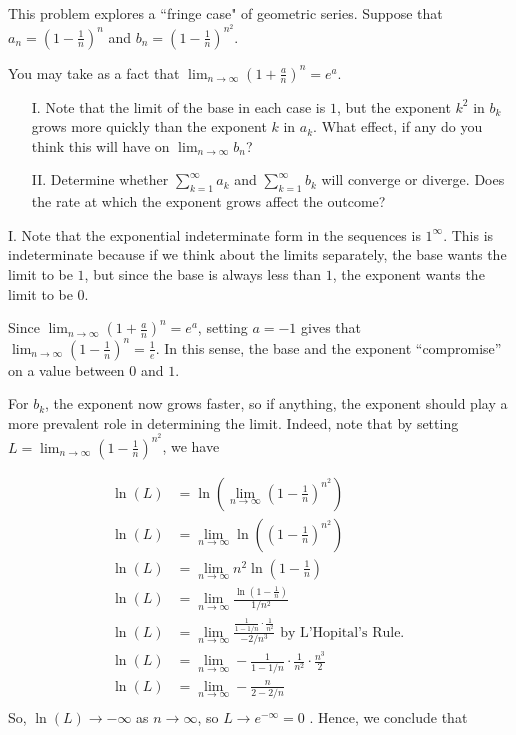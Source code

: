 \documentclass[noauthor,handout]{ximera}
\begin{document}
\begin{problem}
This problem explores a ``fringe case" of geometric series.  Suppose that $a_n = \left(1-\frac{1}{n}\right)^n$ and $b_n = \left(1-\frac{1}{n}\right)^{n^2}$.  

You may take as a fact that $\lim_{n \to \infty} \left(1+\frac{a}{n}\right)^n = e^a$.

\begin{itemize}
\item[I.] Note that the limit of the base in each case is $1$, but the exponent $k^2$ in $b_k$ grows more quickly than the exponent $k$ in $a_k$.  What effect, if any do you think this will have on $\lim_{n \to \infty} b_n$?
\item[II.] Determine whether $\sum_{k=1}^{\infty} a_k$ and $\sum_{k=1}^{\infty} b_k$ will converge or diverge.  Does the rate at which the exponent grows affect the outcome?
\end{itemize}

\begin{freeResponse}
I. Note that the exponential indeterminate form in the sequences is $1^{\infty}$.  This is indeterminate because if we think about the limits separately, the base wants the limit to be $1$, but since the base is always less than $1$, the exponent wants the limit to be $0$. 

Since $\lim_{n \to \infty} \left(1+\frac{a}{n}\right)^n = e^a$, setting $a=-1$ gives that $\lim_{n \to \infty} \left(1-\frac{1}{n}\right)^n = \frac{1}{e}.$  In this sense, the base and the exponent ``compromise'' on a value between $0$ and $1$.  

For $b_k$, the exponent now grows faster, so if anything, the exponent should play a more prevalent role in determining the limit.  Indeed, note that by setting $L = \lim_{n \to \infty} \left(1-\frac{1}{n}\right)^{n^2}$, we have

\begin{align*}
\ln(L) &= \ln\left(  \lim_{n \to \infty} \left(1-\frac{1}{n}\right)^{n^2} \right) \\
\ln(L) &= \lim_{n \to \infty} \ln\left(\left(1-\frac{1}{n}\right)^{n^2} \right) \\
\ln(L) &= \lim_{n \to \infty} n^2 \ln \left(1-\frac{1}{n}\right) \\
\ln(L) &= \lim_{n \to \infty} \frac{\ln \left(1-\frac{1}{n}\right)}{1/n^2} \\
\ln(L) &= \lim_{n \to \infty} \frac{\frac{1}{1-1/n} \cdot \frac{1}{n^2}}{-2/n^3} \textrm{ by L'Hopital's Rule. } \\
\ln(L) &= \lim_{n \to \infty} -\frac{1}{1-1/n} \cdot \frac{1}{n^2} \cdot \frac{n^3}{2}  \\
\ln(L) &= \lim_{n \to \infty} -\frac{n}{2-2/n} \\
\end{align*}
So, $\ln(L) \to -\infty$ as $n \to \infty$, so $L \to e^{-\infty}=0$ .  Hence, we conclude that


\end{freeResponse}
\end{problem}
\end{document}
